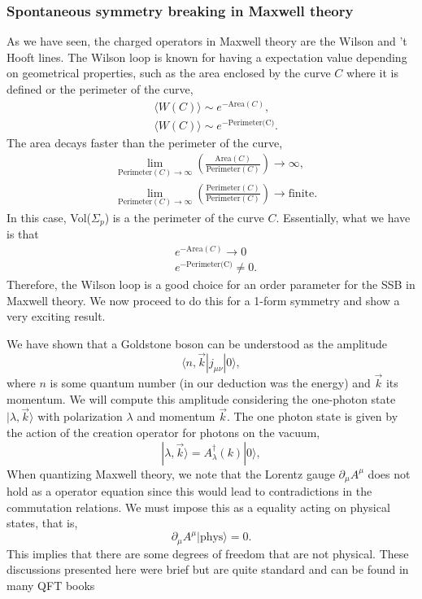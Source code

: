 \documentclass{article}
\begin{document}
\subsubsection{Spontaneous symmetry breaking in Maxwell theory}
As we have seen, the charged operators in Maxwell theory are the Wilson and 't Hooft lines. The Wilson loop is known for having a expectation value depending on geometrical properties, such as the area enclosed by the curve $C$ where it is defined or the perimeter of the curve, 
\begin{align}
	&\langle W(C) \rangle \sim e^{-\text{Area}(C)},\\
	&\langle W(C) \rangle \sim e^{-\text{Perimeter(C)}}. 
\end{align}
The area decays faster than the perimeter of the curve, 
\begin{align}
	&	\lim_{\text{Perimeter}(C)\to\infty}\left(\frac{\text{Area}(C)}{\text{Perimeter}(C)}\right) \to \infty, \\
	& \lim_{\text{Perimeter}(C)\to\infty}\left(\frac{\text{Perimeter}(C)}{\text{Perimeter}(C)}\right) \to \text{finite.}
\end{align}
In this case, Vol($\Sigma_p$) is a the perimeter of the curve $C$. 
Essentially, what we have is that
\begin{align}
	&e^{-\text{Area}(C)} \to 0\\
	&e^{-\text{Perimeter(C)}} \neq 0.
\end{align}
Therefore, the Wilson loop is a good choice for an order parameter for the SSB in Maxwell theory. We now proceed to do this for a 1-form symmetry and show a very exciting result.  

We have shown that a Goldstone boson can be understood as the amplitude 
\begin{equation}
	\langle n,\vec{k}| j_{\mu\nu}|0\rangle,
\end{equation}
where $n$ is some quantum number (in our deduction was the energy) and $\vec{k}$ its momentum. We will compute this amplitude considering the one-photon state $|\lambda,\vec{k}\rangle$ with polarization $\lambda$ and momentum $\vec{k}$. The one photon state is given by the action of the creation operator for photons on the vacuum, 
\begin{equation}
	|\lambda,\vec{k}\rangle=A_\lambda^{\dagger}(k)|0\rangle,
\end{equation}
When quantizing Maxwell theory, we note that the Lorentz gauge $\partial_\mu A^{\mu}$ does not hold as a operator equation since this would lead to contradictions in the commutation relations. We must impose this as a equality acting on physical states, that is, 
\begin{equation}
	\partial_\mu A^{\mu}|\text{phys}\rangle =0.
\end{equation}
This implies that there are some degrees of freedom that are not physical. These discussions presented here were brief but are quite standard and can be found in many QFT books
\end{document}

